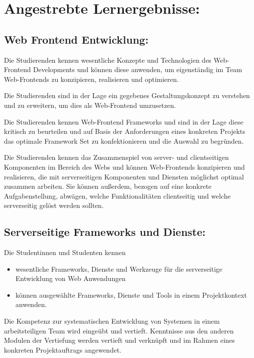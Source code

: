 \section*{Angestrebte
Lernergebnisse:}\label{angestrebte-lernergebnisse-26}

\subsection*{Web Frontend
Entwicklung:}\label{web-frontend-entwicklung}

Die Studierenden kennen wesentliche Konzepte und Technologien des
Web-Frontend Developments und können diese anwenden, um eigenständig im
Team Web-Frontends zu konzipieren, realisieren und optimieren.

Die Studierenden sind in der Lage ein gegebenes Gestaltungskonzept zu
verstehen und zu erweitern, um dies als Web-Frontend umzusetzen.

Die Studierenden kennen Web-Frontend Frameworks und sind in der Lage
diese kritisch zu beurteilen und auf Basis der Anforderungen eines
konkreten Projekts das optimale Framework Set zu konfektionieren und die
Auswahl zu begründen.

Die Studierenden kennen das Zusammenspiel von server- und clientseitigen
Komponenten im Bereich des Webs und können Web-Frontends konzipieren und
realisieren, die mit serverseitigen Komponenten und Diensten möglichst
optimal zusammen arbeiten. Sie können außerdem, bezogen auf eine
konkrete Aufgabenstellung, abwägen, welche Funktionalitäten clientseitig
und welche serverseitig gelöst werden sollten.

\subsection*{Serverseitige Frameworks und
Dienste:}\label{serverseitige-frameworks-und-dienste}

Die Studentinnen und Studenten kennen

\begin{itemize}
\item
  wesentliche Frameworks, Dienste und Werkzeuge für die serverseitige
  Entwicklung von Web Anwendungen
\item
  können ausgewählte Frameworks, Dienste und Tools in einem
  Projektkontext anwenden.
\end{itemize}

Die Kompetenz zur systematischen Entwicklung von Systemen in einem
arbeitsteiligen Team wird eingeübt und vertieft. Kenntnisse aus den
anderen Modulen der Vertiefung werden vertieft und verknüpft und im
Rahmen eines konkreten Projektauftrags angewendet.

